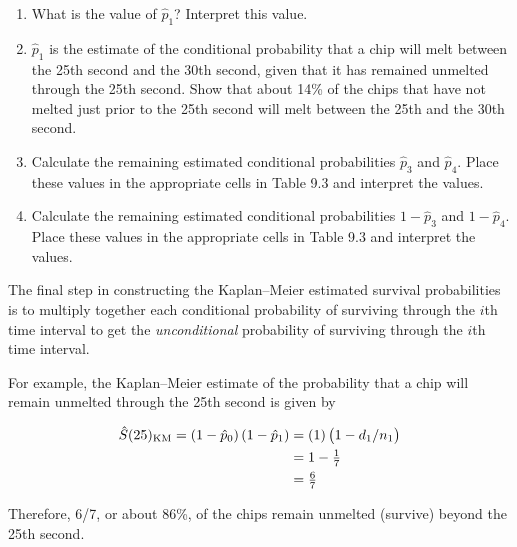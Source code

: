 \documentclass[
]{report}
\providecommand{\tightlist}{%
  \setlength{\itemsep}{0pt}\setlength{\parskip}{0pt}}
\begin{document}
\begin{enumerate}
\def\labelenumi{\arabic{enumi}.}
\setcounter{enumi}{8}
\tightlist
\item
  What is the value of \(\hat p_1\)? Interpret this value.\\
\item
  \(\hat p_1\) is the estimate of the conditional probability that a chip will melt between the 25th second and the 30th second, given that it has remained unmelted through the 25th second. Show that about 14\% of the chips that have not melted just prior to the 25th second will melt between the 25th and the 30th second.\\
\item
  Calculate the remaining estimated conditional probabilities \(\hat p_3\) and \(\hat p_4\). Place these values in the appropriate cells in Table 9.3 and interpret the values.\\
\item
  Calculate the remaining estimated conditional probabilities \(1 - \hat p_3\) and \(1 - \hat p_4\). Place these values in the appropriate cells in Table 9.3 and interpret the values.
\end{enumerate}

The final step in constructing the Kaplan--Meier estimated survival probabilities is to multiply together each conditional probability of surviving through the \(i\)th time interval to get the \emph{unconditional} probability of surviving through the \(i\)th time interval.

For example, the Kaplan--Meier estimate of the probability that a chip will remain unmelted through the 25th second is given by

\begin{align}
\hat S(25)_{\mathrm{KM}} = (1 - \hat p_0)\,(1 - \hat p_1) &= (1)\,\bigl(1 - d_1/n_1\bigr) \notag \\
&= 1 - \tfrac{1}{7} \notag \\ 
&= \tfrac{6}{7} \notag
\end{align}

Therefore, 6/7, or about 86\%, of the chips remain unmelted (survive) beyond the 25th second.

\large
\end{document}

